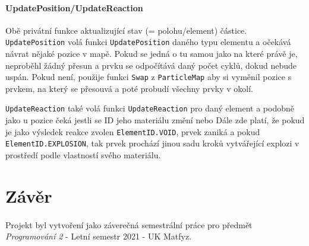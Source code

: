 \documentclass[a4paper, 12pt]{article}
\begin{document}
\paragraph{UpdatePosition/UpdateReaction}
Obě privátní funkce aktualizující stav (= polohu/element) částice.
\texttt{UpdatePosition} volá funkci \texttt{UpdatePosition} daného typu
elementu a očekává návrat nějaké pozice v mapě. Pokud se jedná o tu samou jako
na které právě je, neproběhl žádný přesun a prvku se odpočítává daný počet
cyklů, dokud nebude uspán. Pokud není, použije funkci \texttt{Swap} z \texttt{ParticleMap} 
aby si vyměnil pozice s prvkem, na který se přesouvá a poté probudí 
všechny prvky v okolí.

\texttt{UpdateReaction} také volá funkci \texttt{UpdateReaction} pro daný
element a podobně jako u pozice čeká jestli se ID jeho materiálu změní nebo
Dále zde platí, že pokud je jako výsledek reakce zvolen
\texttt{ElementID.VOID}, prvek zaniká a pokud \texttt{ElementID.EXPLOSION}, tak
prvek prochází jinou sadu kroků vytvářející explozi v prostředí podle
vlastností svého materiálu.


\newpage
\section{Závěr}
\paragraph{}
Projekt byl vytvoření jako záverečná semestrální práce pro předmět
\\\emph{Programování 2} - Letní semestr 2021 - UK Matfyz.
\end{document}
